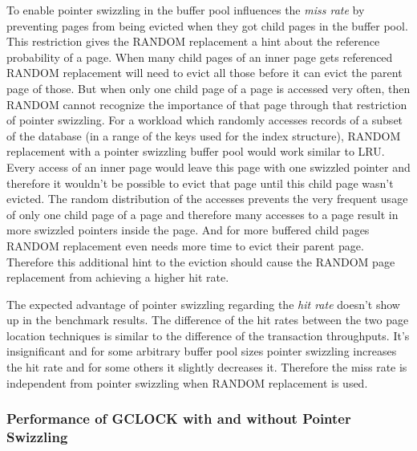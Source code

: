 	To enable pointer swizzling in the buffer pool influences the \emph{miss rate} by preventing pages from being evicted when they got child pages in the buffer pool. This restriction gives the RANDOM replacement a hint about the reference probability of a page. When many child pages of an inner page gets referenced RANDOM replacement will need to evict all those before it can evict the parent page of those. But when only one child page of a page is accessed very often, then RANDOM cannot recognize the importance of that page through that restriction of pointer swizzling. For a workload which randomly accesses records of a subset of the database (in a range of the keys used for the index structure), RANDOM replacement with a pointer swizzling buffer pool would work similar to LRU. Every access of an inner page would leave this page with one swizzled pointer and therefore it wouldn't be possible to evict that page until this child page wasn't evicted. The random distribution of the accesses prevents the very frequent usage of only one child page of a page and therefore many accesses to a page result in more swizzled pointers inside the page. And for more buffered child pages RANDOM replacement even needs more time to evict their parent page. Therefore this additional hint to the eviction should cause the RANDOM page replacement from achieving a higher hit rate.
	
	The expected advantage of pointer swizzling regarding the \emph{hit rate} doesn't show up in the benchmark results. The difference of the hit rates between the two page location techniques is similar to the difference of the transaction throughputs. It's insignificant and for some arbitrary buffer pool sizes pointer swizzling increases the hit rate and for some others it slightly decreases it. Therefore the miss rate is independent from pointer swizzling when RANDOM replacement is used.
	
\subsubsection{Performance of GCLOCK with and without Pointer Swizzling}

